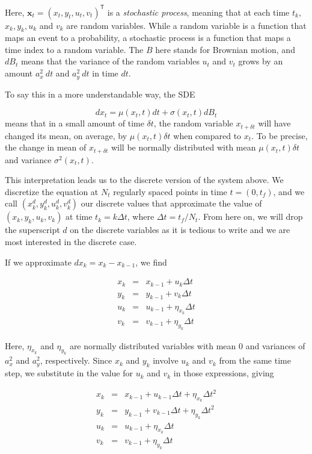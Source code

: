 \documentclass{article}
\newcommand{\tr}{^\mathsf{T}}
\begin{document}
Here, $\mathbf{x}_t = (x_t,y_t,u_t,v_t)\tr$ is a \emph{stochastic process}, 
meaning that at each time $t_k$, $x_k,y_k,u_k$ and $v_k$ are random variables. 
While a random variable is a function that maps an event to a probability,
a stochastic process is a function that maps a time index to a random variable. 
The $B$ here stands for Brownian motion, and $dB_t$ means that the variance of 
the random variables $u_t$ and $v_t$ grows by an amount $a_x^2~dt$ and 
$a_y^2~dt$ in time $dt$.

To say this in a more understandable way, the SDE

\[dx_t = \mu(x_t,t)dt + \sigma(x_t,t)dB_t\]
means that in a small amount of time $\delta t$, 
the random variable $x_{t + \delta t}$ will have changed its mean, on average,
by $\mu(x_t,t) \delta t$ when compared to $x_t$.  To be precise, the change in 
mean of $x_{t + \delta t}$ will be normally distributed with mean 
$\mu(x_t,t)\delta t$ and variance $\sigma^2(x_t,t)$.  

This interpretation leads us to the discrete version of the system above.  
We discretize the equation at $N_t$ regularly spaced points in time
$t = (0,t_f)$, and we call $(x_k^d,y_k^d,u_k^d,v_k^d)$ our 
discrete values
that approximate the value of $(x_k,y_k,u_k,v_k)$ at time $t_k = k \Delta t$, 
where $\Delta t = t_f/N_t$.  From here on, we will drop the superscript $d$ on 
the discrete variables as it is tedious to write and we are most interested in 
the discrete case.

If we approximate $dx_k = x_k - x_{k-1}$, we find

\[\begin{array}{rcl}
x_k & = & x_{k-1} + u_k \Delta t \\
y_k & = & y_{k-1} + v_k \Delta t \\
u_k & = & u_{k-1} + \eta_{x_k} \Delta t \\
v_k & = & v_{k-1} + \eta_{y_k} \Delta t
\end{array}\]  

Here, 
$\eta_{x_k}$ and $\eta_{y_k}$ are normally distributed variables with 
mean 0 and variances of $a_x^2$ and $a_y^2$, respectively.  Since $x_k$ and 
$y_k$ involve $u_k$ and $v_k$ from the same time step, we substitute in the 
value for $u_k$ and $v_k$ in those expressions, giving

\[\begin{array}{rcl}
x_k & = & x_{k-1} + u_{k-1} \Delta t + \eta_{x_k} \Delta t^2\\
y_k & = & y_{k-1} + v_{k-1} \Delta t + \eta_{y_k} \Delta t^2\\
u_k & = & u_{k-1} + \eta_{x_k} \Delta t \\
v_k & = & v_{k-1} + \eta_{y_k} \Delta t
\end{array}\]  
\end{document}
